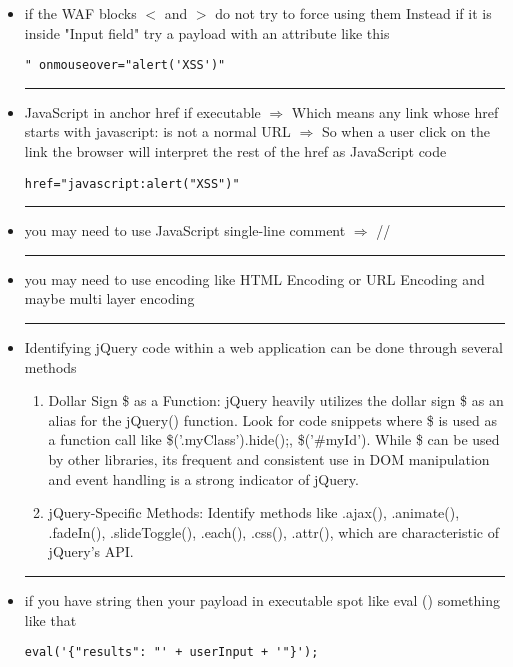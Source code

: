 \documentclass{article}
\begin{document}
\begin{itemize}
    \item if the WAF blocks $<$ and $>$ do not try to force using them Instead if it is
          inside "Input field" try a payload with an attribute like this
          \begin{lstlisting}[frame=single]
                    " onmouseover="alert('XSS')"
            \end{lstlisting}
            \rule{5cm}{0.4pt}
    \item JavaScript in anchor href if executable $\Longrightarrow$ Which means any link
          whose href starts with javascript: is not a normal URL $\Longrightarrow$ So
          when a user click on the link the browser will interpret the rest of the href
          as JavaScript code
          \begin{lstlisting}[frame=single]
                    href="javascript:alert("XSS")"
            \end{lstlisting}
            \rule{5cm}{0.4pt}
    \item you may need to use JavaScript single-line comment $\Longrightarrow$ //
    \\ \rule{5cm}{0.4pt}
    \item you may need to use encoding like HTML Encoding or URL Encoding and maybe multi layer encoding \\
    \rule{5cm}{0.4pt}
      \item Identifying jQuery code within a web application can be done through several methods
      \begin {enumerate}
      \item Dollar Sign \$ as a Function: jQuery heavily utilizes the dollar sign \$ as an alias for the jQuery() function. Look for code snippets where \$ is used as a function call like \$('.myClass').hide();, \$('\#myId'). While \$ can be used by other libraries, its frequent and consistent use in DOM manipulation and event handling is a strong indicator of jQuery.
      \item  jQuery-Specific Methods: Identify methods like .ajax(), .animate(), .fadeIn(), .slideToggle(), .each(), .css(), .attr(), which are characteristic of jQuery's API.
      \end {enumerate}
      \rule{5cm}{0.4pt}
      \item if you have string then your payload in executable spot like eval () something like that 
            \begin{lstlisting}[frame=single]
                    eval('{"results": "' + userInput + '"}');
            \end{lstlisting}

\end{itemize}
\end{document}
